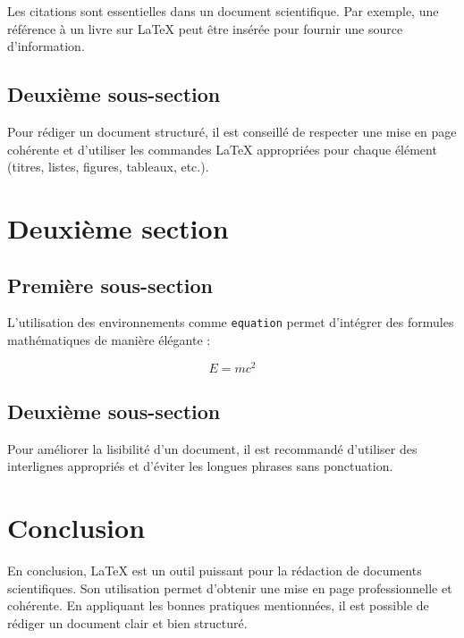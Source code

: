 Les citations sont essentielles dans un document scientifique. Par exemple, une référence à un livre sur LaTeX \cite{latex:companion} peut être insérée pour fournir une source d'information.

\subsection{Deuxième sous-section}

Pour rédiger un document structuré, il est conseillé de respecter une mise en page cohérente et d'utiliser les commandes LaTeX appropriées pour chaque élément (titres, listes, figures, tableaux, etc.).

\section{Deuxième section}

\subsection{Première sous-section}

L'utilisation des environnements comme \texttt{equation} permet d'intégrer des formules mathématiques de manière élégante :

\begin{equation}
	E = mc^2
\end{equation}

\subsection{Deuxième sous-section}

Pour améliorer la lisibilité d'un document, il est recommandé d'utiliser des interlignes appropriés et d'éviter les longues phrases sans ponctuation.

\section{Conclusion}

En conclusion, LaTeX est un outil puissant pour la rédaction de documents scientifiques. Son utilisation permet d'obtenir une mise en page professionnelle et cohérente. En appliquant les bonnes pratiques mentionnées, il est possible de rédiger un document clair et bien structuré.

